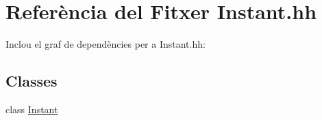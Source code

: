 \hypertarget{_instant_8hh}{}\section{Referència del Fitxer Instant.\+hh}
\label{_instant_8hh}
Inclou el graf de dependències per a Instant.\+hh\+:
\subsection*{Classes}
\begin{DoxyCompactItemize}
\item 
class \hyperlink{class_instant}{Instant}
\end{DoxyCompactItemize}
